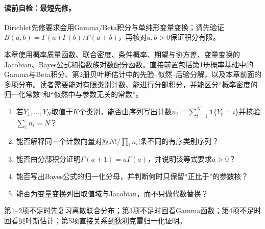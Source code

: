 
\label{struct:V5-C05-CH02}
\paragraph{读前自检：最短先修。}Dirichlet先修要求会用Gamma/Beta积分与单纯形变量变换；请先验证$B(a,b)=\Gamma(a)\Gamma(b)/\Gamma(a+b)$，再核对$a,b>0$保证积分有限。\par

\begin{prerequisitebox}
本章使用概率质量函数、联合密度、条件概率、期望与协方差、变量变换的Jacobian、Bayes公式和指数族对数配分函数。直接前置包括第1册概率基础中的Gamma与Beta积分、第2册贝叶斯估计中的先验--似然--后验分解，以及本章前面的多项分布。读者需要能对有限类别计数、能进行分部积分，并能区分“概率密度的归一化常数”和“似然中与参数无关的常数”。
\end{prerequisitebox}

\label{struct:V5-C05-CH03}
\begin{precheckbox}
\begin{enumerate}[leftmargin=2.2em]
  \item 若$Y_1,\ldots,Y_N$取值于$K$个类别，能否由序列写出计数$n_i=\sum_{t=1}^N\mathbf 1\{Y_t=i\}$并核验$\sum_i n_i=N$？
  \item 能否解释同一个计数向量对应$N!/\prod_i n_i!$条不同的有序类别序列？
  \item 能否由分部积分证明$\Gamma(a+1)=a\Gamma(a)$，并说明该等式要求$a>0$？
  \item 能否写出Bayes公式的归一化分母，并判断何时只保留“正比于”的参数核？
  \item 能否为变量变换列出取值域与Jacobian，而不只做代数替换？
\end{enumerate}
第1--2项不足时先复习离散联合分布；第3项不足时回看Gamma函数；第4项不足时回看贝叶斯估计；第5项直接关系到狄利克雷归一化证明。
\end{precheckbox}

